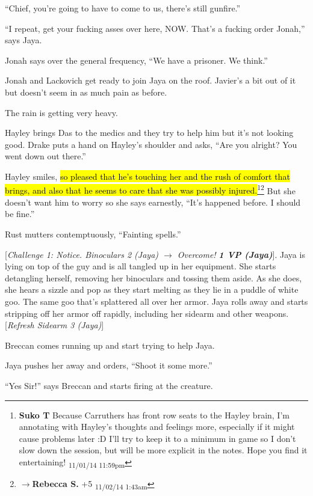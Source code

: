 ``Chief, you're going to have to come to us, there's still gunfire.''

``I repeat, get your fucking asses over here, NOW.  That's a fucking order Jonah,'' says Jaya.

Jonah says over the general frequency, ``We have a prisoner.  We think.''

Jonah and Lackovich get ready to join Jaya on the roof.  Javier's a bit out of it but doesn't seem in as much pain as before.

The rain is getting very heavy.



Hayley brings Das to the medics and they try to help him but it's not looking good.  Drake puts a hand on Hayley's shoulder and asks, ``Are you alright?  You went down out there.''

Hayley smiles, \hl{so pleased that he's touching her and the rush of comfort that brings, and also that he seems to care that she was possibly injured.}\footnote{\textbf{Suko T }Because Carruthers has front row seats to the Hayley brain, I'm annotating with Hayley's thoughts and feelings more, especially if it might cause problems later :D  I'll try to keep it to a minimum in game so I don't slow down the session, but will be more explicit in the notes.  Hope you find it entertaining! \textsubscript{11/01/14 11:59pm}}\footnote{$\rightarrow$\textbf{Rebecca S. }+5 \textsubscript{11/02/14 1:43am}} But she doesn't want him to worry so she says earnestly, ``It's happened before.  I should be fine.''

Rust mutters contemptuously, ``Fainting spells.''



{[}\textit{Challenge 1: Notice.  Binoculars 2 (Jaya) $\rightarrow$ Overcome! }\textit{\textbf{1 VP (Jaya)}}{]}.  Jaya is lying on top of the guy and is all tangled up in her equipment.  She starts detangling herself, removing her binoculars and tossing them aside.  As she does, she hears a sizzle and pop as they start melting as they lie in a puddle of white goo.  The same goo that's splattered all over her armor.  Jaya rolls away and starts stripping off her armor off rapidly, including her sidearm and other weapons.   {[}\textit{Refresh Sidearm 3 (Jaya)}{]}

Breccan comes running up and start trying to help Jaya.

Jaya pushes her away and orders, ``Shoot it some more.''

``Yes Sir!'' says Breccan and starts firing at the creature.

